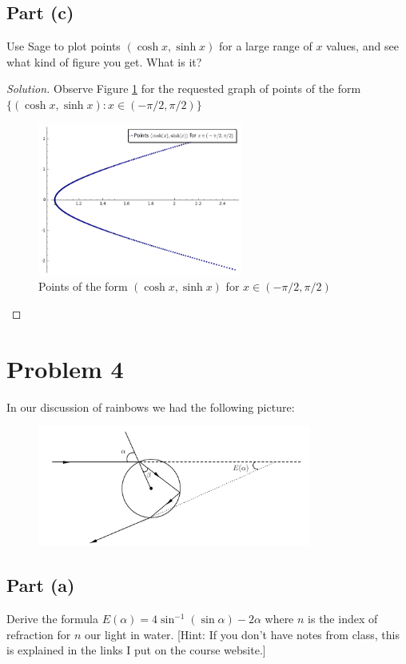 \documentclass[letterpaper, 12pt]{amsart}
\theoremstyle{definition}  %
\begin{document}
		\subsection*{Part (c)}
		Use Sage to plot points $(\cosh x, \sinh x)$ for a large range of $x$ values, and see what kind of figure you get. 
		What is it?

		\begin{proof}[Solution]
		Observe Figure \ref{hypPoints} for the requested graph of points of the form $\{ (\cosh x, \sinh x) : x \in(-\pi/2, \pi/2) \}$

			\begin{figure}[h]
				\includegraphics[width=0.6\textwidth]{figs/b.png}
				\caption{Points of the form $(\cosh x, \sinh x)$ for $x \in (-\pi/2, \pi/2)$}
				\label{hypPoints}
			\end{figure}
		\end{proof}
	\pagebreak

	\section*{Problem 4}
	In our discussion of rainbows we had the following picture:
	\begin{figure}[h]
		\includegraphics[width=0.8\textwidth]{figs/1.png}
	\end{figure}

		\subsection*{Part (a)}
		Derive the formula $E(\alpha) = 4 \sin^{-1}(\sin \alpha) - 2 \alpha$ where $n$ is the index of refraction for $n$ our light in water. 
		[Hint: If you don’t have notes from class, this is explained in the links I put on the course website.]
\end{document}
